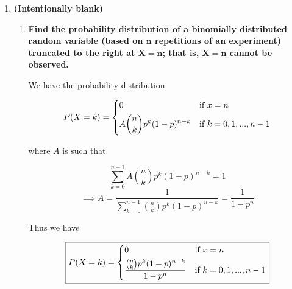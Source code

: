 \documentclass[10pt, oneside]{article}
\begin{document}
\begin{enumerate}[label=9.\arabic*]
\begin{align*}
E[X] &= C\alpha \bigg( -\frac{x}{\alpha} e^{-\alpha x} \bigg|^{+\infty}_\gamma + \frac{1}{\alpha} \int^{+\infty}_\gamma e^{-\alpha x} \ dx \bigg) \\
&= C\alpha \bigg( \frac{\gamma}{\alpha} e^{-\alpha \gamma} + \frac{1}{\alpha} \bigg( -\frac{1}{\alpha} e^{-\alpha x} \bigg|^{+\infty}_\gamma \bigg) \bigg) \\
&= C\alpha \bigg( \frac{\gamma}{\alpha} e^{-\alpha \gamma} + \frac{1}{\alpha^2} e^{-\alpha \gamma} \bigg) \\
&= \alpha e^{\alpha \gamma} \bigg( \frac{\gamma}{\alpha} e^{-\alpha \gamma} + \frac{1}{\alpha^2} e^{-\alpha \gamma} \bigg) \\
&= \boxed{\gamma + \frac{1}{\alpha}}
\end{align*}

\item  \begin{tcolorbox}[
  colback=Cerulean!5!white,
  colframe=Cerulean!75!black]
\textbf{(Intentionally blank)}
\end{tcolorbox}

	\begin{enumerate}
	\item  \begin{tcolorbox}[
	  colback=Cerulean!5!white,
	  colframe=Cerulean!75!black]
	\textbf{Find the probability distribution of a binomially distributed random variable (based on $\bm{n}$ repetitions of an experiment) truncated to the right at $\bm{X = n}$; that is, $\bm{X = n}$ cannot be observed.}
	\end{tcolorbox}
	
	We have the probability distribution
	
	\[
	P(X = k) = \begin{dcases}
	0 & \text{if } x = n \\
	A \binom{n}{k} p^k (1-p)^{n-k} & \text{if } k = 0, 1, ..., n-1
	\end{dcases}
	\]
	
	where $A$ is such that
	
	\[ \sum^{n-1}_{k=0} A \binom{n}{k} p^k (1-p)^{n-k} = 1 \]
	\[ \implies A = \frac{1}{\sum^{n-1}_{k=0} \binom{n}{k} p^k (1-p)^{n-k}} = \frac{1}{1-p^n} \]
	
	Thus we have
	
		\[ \boxed{
	P(X = k) = \begin{dcases}
	0 & \text{if } x = n \\
	\frac{\binom{n}{k} p^k (1-p)^{n-k}}{1-p^n} & \text{if } k = 0, 1, ..., n-1
	\end{dcases} }
	\]
	

\end{enumerate}
\end{enumerate}
\end{document}
